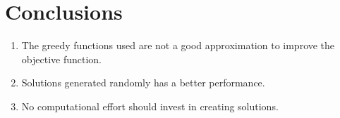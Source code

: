 
\section{Conclusions}
\begin{frame}
  \begin{enumerate}
  \item The greedy functions used are not a good approximation to improve the objective function.
  \item Solutions generated randomly has a better performance.
  \item No computational effort should invest in creating solutions.
  \end{enumerate}
\end{frame}
